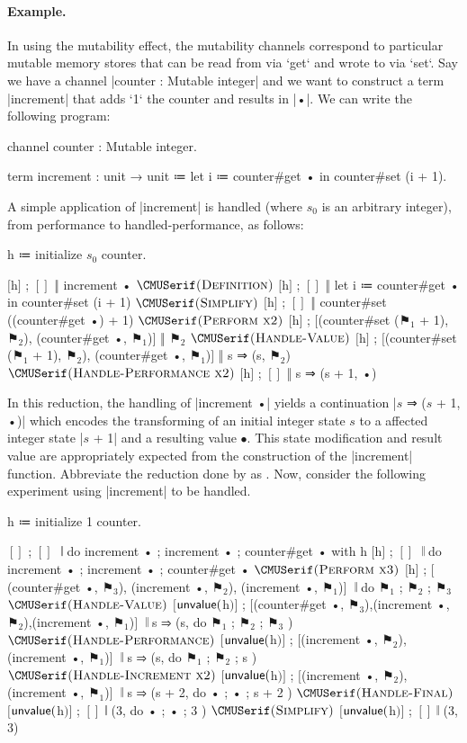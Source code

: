 \paragraph{Example.}
In using the mutability effect, the mutability channels correspond to particular mutable memory stores that can be read from via \code`get` and wrote to via \code`set`.
Say we have a channel \code|counter : Mutable integer| and we want to construct a term \code|increment| that adds \code`1` the counter and results in \code|•|.
We can write the following program:
\begin{snippet}
channel counter : Mutable integer.

term increment : unit → unit
  ≔ let i ≔ counter#get • in
    counter#set (i + 1).
\end{snippet}
A simple application of \code|increment| is handled (where $s_0$ is an arbitrary integer), from performance to handled-performance, as follows:
\begin{snippet}
h ≔ initialize $s_0$ counter.

$[$h$]$ ; $[]$ ‖ increment •
$\ruleapp{Definition}$
$[$h$]$ ; $[]$ ‖ let i ≔ counter#get • in counter#set (i + 1)
$\ruleapp{Simplify}$
$[$h$]$ ; $[]$ ‖ counter#set ((counter#get •) + 1)
$\ruleapp{Perform x2}$
$[$h$]$ ; $[$(counter#set ($⚑_1$ + 1), $⚑_2$), (counter#get •, $⚑_1$)$]$ ‖ $⚑_2$
$\ruleapp{Handle-Value}$
$[$h$]$ ; $[$(counter#set ($⚑_1$ + 1), $⚑_2$), (counter#get •, $⚑_1$)$]$ ‖ s ⇒ (s, $⚑_2$)
$\ruleapp{Handle-Performance x2}$
$[$h$]$ ; $[]$ ‖ s ⇒ (s + 1, •)
\end{snippet}
In this reduction, the handling of \code|increment •| yields a continuation \code|$s$ ⇒ ($s$ + 1, •)| which encodes the transforming of an initial integer state $s$ to a affected integer state \code|$s$ + 1| and a resulting value $•$.
This state modification and result value are appropriately expected from the construction of the \code|increment| function.
Abbreviate the reduction done by  as .
Now, consider the following experiment using \code|increment| to be handled.
\begin{snippet}
h ≔ initialize 1 counter.

$[]$ ; $[]$ $ $
  $ $𝄁 do{ increment • ; increment • ; counter#get • } with h
$[$h$]$ ; $[]$ $ $
  $ $𝄁 do{ increment • ; increment • ; counter#get • }
$\ruleapp{Perform x3}$
$[$h$]$ ; $[$(counter#get •, $⚑_3$), (increment •, $⚑_2$), (increment •, $⚑_1$)$]$ $ $
  $ $𝄁 do{ $⚑_1$ ; $⚑_2$ ; $⚑_3$ }
$\ruleapp{Handle-Value}$
$[$$\mathsf{unvalue}($h$)$$]$ ; $[$(counter#get •, $⚑_3$),(increment •, $⚑_2$),(increment •, $⚑_1$)$]$ $ $
  $ $𝄁 s ⇒ (s, do{ $⚑_1$ ; $⚑_2$ ; $⚑_3$ })
$\ruleapp{Handle-Performance}$
$[$$\mathsf{unvalue}($h$)$$]$ ; $[$(increment •, $⚑_2$), (increment •, $⚑_1$)$]$ $ $
  $ $𝄁 s ⇒ (s, do{ $⚑_1$ ; $⚑_2$ ; s })
$\ruleapp{Handle-Increment x2}$
$[$$\mathsf{unvalue}($h$)$$]$ ; $[$(increment •, $⚑_2$), (increment •, $⚑_1$)$]$ $ $
  $ $𝄁 s ⇒ (s + 2, do{ • ; • ; s + 2 })
$\ruleapp{Handle-Final}$
$[$$\mathsf{unvalue}($h$)$$]$ ; $[]$ 𝄁 (3, do{ • ; • ; 3 })
$\ruleapp{Simplify}$
$[$$\mathsf{unvalue}($h$)$$]$ ; $[]$ 𝄁 (3, 3)
\end{snippet}


